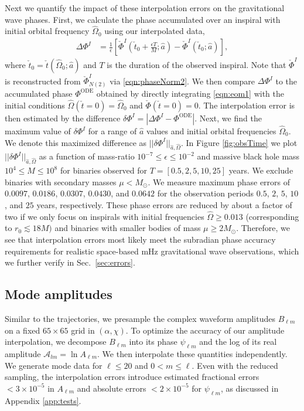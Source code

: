 \documentclass[%
 reprint,
 nofootinbib,
 amsmath,amssymb,
 aps,
 prd,
]{revtex4-2}
\begin{document}
Next we quantify the impact of these interpolation errors on the gravitational wave phases.  First, we calculate the phase accumulated over an inspiral with initial orbital frequency $\hat{\Omega}_0$ using our interpolated data,
\begin{align}
    \Delta \Phi^I &= \frac{1}{\epsilon}\left[\check{\Phi}^I\left(\check{t}_0 + \frac{\epsilon T}{M}; \hat{a} \right) - \check{\Phi}^I\left(\check{t}_0; \hat{a}\right) \right],
\end{align}
where $\check{t}_0 = \check{t}(\hat{\Omega}_0; \hat{a})$ and $T$ is the duration of the observed inspiral. Note that $\check{\Phi}^I$ is reconstructed from $\check{\Phi}^I_{N(2)}$ via \eqref{eqn:phaseNorm2}. We then compare $\Delta \Phi^I$ to the accumulated phase $\Phi^\mathrm{ODE}$ obtained by directly integrating \eqref{eqn:eom1} with the initial conditions $\hat{\Omega}(\check{t}=0) = \hat{\Omega}_0$ and $\check{\Phi}(\check{t}=0) = 0$. The interpolation error is then estimated by the difference $\delta \Phi^I = |\Delta\Phi^I - \Phi^\mathrm{ODE}|$. Next, we find the maximum value of $\delta \Phi^I$ for a range of $\hat{a}$ values and initial orbital frequencies $\hat{\Omega}_0$. We denote this maximized difference as $||\delta \Phi^I||_{\hat{a},\hat{\Omega}}$. In Figure \ref{fig:obsTime} we plot $||\delta \Phi^I||_{\hat{a},\hat{\Omega}}$ as a function of mass-ratio $10^{-7} \leq \epsilon \leq 10^{-2}$ and massive black hole mass $10^{4} \leq M \leq 10^{8}$ for binaries observed for $T = [0.5, 2, 5, 10, 25]$ years. We exclude binaries with secondary masses $\mu < M_\odot$. We measure maximum phase errors of $0.0097$, $0.0186$, $0.0307$, $0.0430$, and $0.0642$ for the observation periods $0.5$, $2$, $5$, $10$, and $25$ years, respectively. These phase errors are reduced by about a factor of two if we only focus on inspirals with initial frequencies $\hat{\Omega} \geq 0.013$ (corresponding to $r_0 \lesssim 18 M)$ and binaries with smaller bodies of mass $\mu \geq 2 M_\odot$. Therefore, we see that interpolation errors most likely meet the subradian phase accuracy requirements for realistic space-based mHz gravitational wave observations, which we further verify in Sec.~\ref{sec:errors}.

\subsection{Mode amplitudes}
\label{sec:amp}

Similar to the trajectories, we presample the complex waveform amplitudes $B_{\ell m}$ on a fixed $65 \times 65$ grid in $(\alpha, \chi)$. To optimize the accuracy of our amplitude interpolation, we decompose $B_{\ell m}$ into its phase $\psi_{\ell m}$ and the log of its real amplitude $\mathcal{A}_{lm} = \ln A_{\ell m}$. We then interpolate these quantities independently. We generate mode data for $\ell \leq 20$ and $0 < m \leq \ell$. Even with the reduced sampling, the interpolation errors introduce estimated fractional errors $< 3\times 10^{-5}$ in $A_{\ell m}$ and absolute errors $<2 \times 10^{-5}$ for $\psi_{\ell m}$, as discussed in Appendix \ref{app:tests}.
\end{document}
